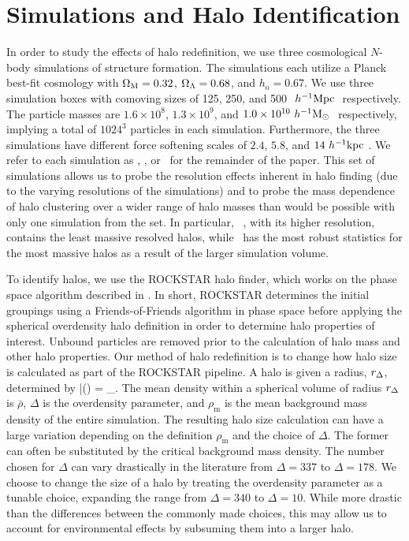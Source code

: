 \documentclass[usenatbib,usegraphicx,letterpaper]{mn2e}
\begin{document}
\section[]{Simulations and Halo Identification}
\label{section:data}

In order to study the effects of halo redefinition, we use three cosmological $N$-body simulations of structure
formation. The \citet{diemer15} simulations each utilize a Planck best-fit cosmology with $\Omega_{\mathrm{M}} = 0.32$, $\Omega_{\Lambda} =
0.68$, and $h_{\mathrm{o}} = 0.67$. We use three simulation boxes with comoving sizes of 125, 250, and 500
$\ h^{-1}\mathrm{Mpc}~$ respectively. The particle masses are $1.6 \times 10^8$, $1.3 \times 10^9$, and $1.0 \times 10^{10}
\ h^{-1}\mathrm{M}_{\odot}~$ respectively, implying a total of $1024^3$ particles in each simulation. Furthermore, the three
simulations have different force softening scales of $2.4$, $5.8$, and $14 \ h^{-1}\mathrm{kpc}~$. We refer to each simulation as
\simA, \simB, or \simC  \ for the remainder of the paper. This set of simulations allows us to probe the
resolution effects inherent in halo finding (due to the varying resolutions of the simulations) and to probe the
mass dependence of halo clustering over a wider range of halo masses than would be possible with only one
simulation from the set. In particular, \simA~, with its higher resolution, contains the least massive resolved
halos, while \simC~has the most robust statistics for the most massive halos as a result of the larger simulation
volume.

To identify halos, we use the ROCKSTAR halo finder, which works on the phase space algorithm described in
\citet*{behroozi13}. In short, ROCKSTAR determines the initial groupings using a Friends-of-Friends algorithm in
phase space before applying the spherical overdensity halo definition in order to determine halo properties of
interest. Unbound particles are removed prior to the calculation of halo mass and other halo properties. Our
method of halo redefinition is to change how halo size is calculated as part of the ROCKSTAR pipeline. A halo is
given a radius, $r_{\Delta}$, determined by
\beq
	\bar{\rho}(\Rdel) = \Delta \rho_{}.
\eeq
The mean density within a spherical volume of radius $r_{\Delta}$ is $\bar{\rho}$, $\Delta$ is the overdensity
parameter, and $\rho_{\mathrm{m}}$ is the mean background mass density of the entire simulation. The resulting
halo size calculation can have a large variation depending on the definition $\rho_{\mathrm{m}}$ and the choice
of $\Delta$. The former can often be substituted by the critical background mass density. The number chosen for
$\Delta$ can vary drastically in the literature from $\Delta = 337$ to $\Delta = 178$. We choose to change the
size of a halo by treating the overdensity parameter as a tunable choice, expanding the range from $\Delta = 340$
to $\Delta = 10$. While more drastic than the differences between the commonly made choices, this may allow us to
account for environmental effects by subsuming them into a larger halo.
\end{document}
